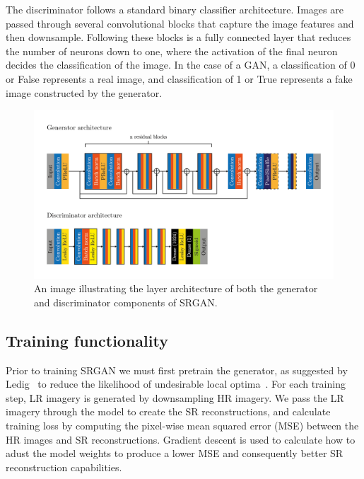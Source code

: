 The discriminator follows a standard binary classifier architecture. Images are passed through several convolutional blocks that capture the image features and then downsample. Following these blocks is a fully connected layer that reduces the number of neurons down to one, where the activation of the final neuron decides the classification of the image. In the case of a GAN, a classification of 0 or False represents a real image, and classification of 1 or True represents a fake image constructed by the generator. 

\begin{figure}
    \includegraphics[width=\linewidth]{./assets/srgan_architecture.png}
    \caption{An image illustrating the layer architecture of both the generator and discriminator components of SRGAN.}
    \label{fig:srgan_architecture}
\end{figure}

\subsection{Training functionality}\label{subsec:training_functionality}
Prior to training SRGAN we must first pretrain the generator, as suggested by Ledig \etal\ to reduce the likelihood of undesirable local optima~\cite{srgan}. For each training step, LR imagery is generated by downsampling HR imagery. We pass the LR imagery through the model to create the SR reconstructions, and calculate training loss by computing the pixel-wise mean squared error (MSE) between the HR images and SR reconstructions. Gradient descent is used to calculate how to adust the model weights to produce a lower MSE and consequently better SR reconstruction capabilities.


